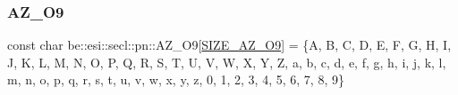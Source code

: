 \subsubsection{\texorpdfstring{A\+Z\+\_\+\+O9}{AZ\_O9}}
{\footnotesize\ttfamily const char be\+::esi\+::secl\+::pn\+::\+A\+Z\+\_\+\+O9\mbox{[}\hyperlink{namespacebe_1_1esi_1_1secl_1_1pn_a1ec87af9e9dbcae67e1e5974e7b96dde}{S\+I\+Z\+E\+\_\+\+A\+Z\+\_\+\+O9}\mbox{]} = \{\textquotesingle{}A\textquotesingle{}, \textquotesingle{}B\textquotesingle{}, \textquotesingle{}C\textquotesingle{}, \textquotesingle{}D\textquotesingle{}, \textquotesingle{}E\textquotesingle{}, \textquotesingle{}F\textquotesingle{}, \textquotesingle{}G\textquotesingle{}, \textquotesingle{}H\textquotesingle{}, \textquotesingle{}I\textquotesingle{}, \textquotesingle{}J\textquotesingle{}, \textquotesingle{}K\textquotesingle{}, \textquotesingle{}L\textquotesingle{}, \textquotesingle{}M\textquotesingle{}, \textquotesingle{}N\textquotesingle{}, \textquotesingle{}O\textquotesingle{}, \textquotesingle{}P\textquotesingle{}, \textquotesingle{}Q\textquotesingle{}, \textquotesingle{}R\textquotesingle{}, \textquotesingle{}S\textquotesingle{}, \textquotesingle{}T\textquotesingle{}, \textquotesingle{}U\textquotesingle{}, \textquotesingle{}V\textquotesingle{}, \textquotesingle{}W\textquotesingle{}, \textquotesingle{}X\textquotesingle{}, \textquotesingle{}Y\textquotesingle{}, \textquotesingle{}Z\textquotesingle{}, \textquotesingle{}a\textquotesingle{}, \textquotesingle{}b\textquotesingle{}, \textquotesingle{}c\textquotesingle{}, \textquotesingle{}d\textquotesingle{}, \textquotesingle{}e\textquotesingle{}, \textquotesingle{}f\textquotesingle{}, \textquotesingle{}g\textquotesingle{}, \textquotesingle{}h\textquotesingle{}, \textquotesingle{}i\textquotesingle{}, \textquotesingle{}j\textquotesingle{}, \textquotesingle{}k\textquotesingle{}, \textquotesingle{}l\textquotesingle{}, \textquotesingle{}m\textquotesingle{}, \textquotesingle{}n\textquotesingle{}, \textquotesingle{}o\textquotesingle{}, \textquotesingle{}p\textquotesingle{}, \textquotesingle{}q\textquotesingle{}, \textquotesingle{}r\textquotesingle{}, \textquotesingle{}s\textquotesingle{}, \textquotesingle{}t\textquotesingle{}, \textquotesingle{}u\textquotesingle{}, \textquotesingle{}v\textquotesingle{}, \textquotesingle{}w\textquotesingle{}, \textquotesingle{}x\textquotesingle{}, \textquotesingle{}y\textquotesingle{}, \textquotesingle{}z\textquotesingle{}, \textquotesingle{}0\textquotesingle{}, \textquotesingle{}1\textquotesingle{}, \textquotesingle{}2\textquotesingle{}, \textquotesingle{}3\textquotesingle{}, \textquotesingle{}4\textquotesingle{}, \textquotesingle{}5\textquotesingle{}, \textquotesingle{}6\textquotesingle{}, \textquotesingle{}7\textquotesingle{}, \textquotesingle{}8\textquotesingle{}, \textquotesingle{}9\textquotesingle{}\}\hspace{0.3cm}{\ttfamily [inline]}}



